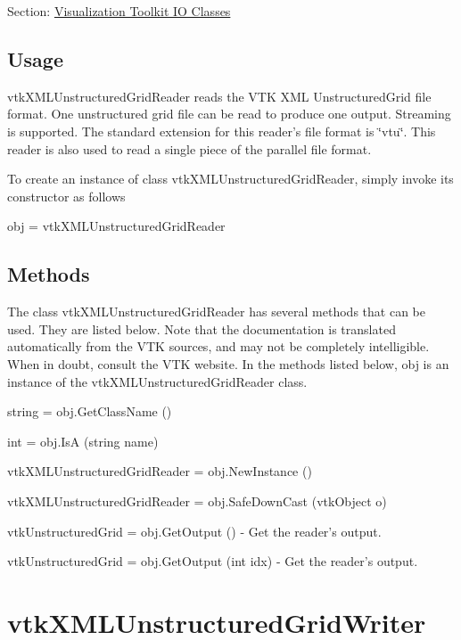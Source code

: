 Section\-: \hyperlink{sec_vtkio}{Visualization Toolkit I\-O Classes} \hypertarget{vtkwidgets_vtkxyplotwidget_Usage}{}\subsection{Usage}\label{vtkwidgets_vtkxyplotwidget_Usage}
vtk\-X\-M\-L\-Unstructured\-Grid\-Reader reads the V\-T\-K X\-M\-L Unstructured\-Grid file format. One unstructured grid file can be read to produce one output. Streaming is supported. The standard extension for this reader's file format is \char`\"{}vtu\char`\"{}. This reader is also used to read a single piece of the parallel file format.

To create an instance of class vtk\-X\-M\-L\-Unstructured\-Grid\-Reader, simply invoke its constructor as follows \begin{DoxyVerb}  obj = vtkXMLUnstructuredGridReader
\end{DoxyVerb}
 \hypertarget{vtkwidgets_vtkxyplotwidget_Methods}{}\subsection{Methods}\label{vtkwidgets_vtkxyplotwidget_Methods}
The class vtk\-X\-M\-L\-Unstructured\-Grid\-Reader has several methods that can be used. They are listed below. Note that the documentation is translated automatically from the V\-T\-K sources, and may not be completely intelligible. When in doubt, consult the V\-T\-K website. In the methods listed below, {\ttfamily obj} is an instance of the vtk\-X\-M\-L\-Unstructured\-Grid\-Reader class. 
\begin{DoxyItemize}
\item {\ttfamily string = obj.\-Get\-Class\-Name ()}  
\item {\ttfamily int = obj.\-Is\-A (string name)}  
\item {\ttfamily vtk\-X\-M\-L\-Unstructured\-Grid\-Reader = obj.\-New\-Instance ()}  
\item {\ttfamily vtk\-X\-M\-L\-Unstructured\-Grid\-Reader = obj.\-Safe\-Down\-Cast (vtk\-Object o)}  
\item {\ttfamily vtk\-Unstructured\-Grid = obj.\-Get\-Output ()} -\/ Get the reader's output.  
\item {\ttfamily vtk\-Unstructured\-Grid = obj.\-Get\-Output (int idx)} -\/ Get the reader's output.  
\end{DoxyItemize}\hypertarget{vtkio_vtkxmlunstructuredgridwriter}{}\section{vtk\-X\-M\-L\-Unstructured\-Grid\-Writer}\label{vtkio_vtkxmlunstructuredgridwriter}
